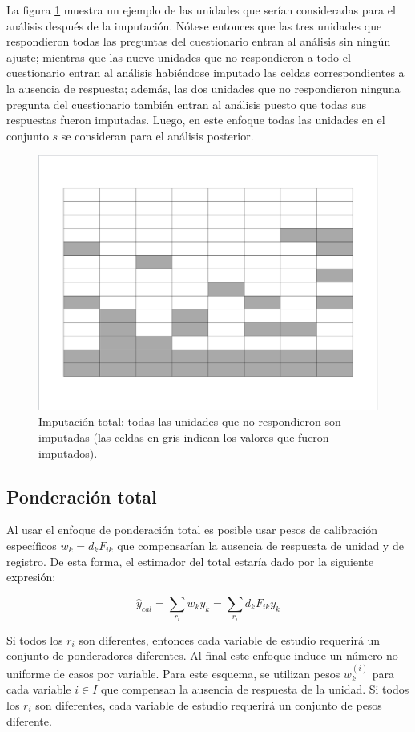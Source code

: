 \documentclass[
  12pt,
]{book}
\begin{document}
La figura \ref{fig:figimptotal} muestra un ejemplo de las unidades que serían consideradas para el análisis después de la imputación. Nótese entonces que las tres unidades que respondieron todas las preguntas del cuestionario entran al análisis sin ningún ajuste; mientras que las nueve unidades que no respondieron a todo el cuestionario entran al análisis habiéndose imputado las celdas correspondientes a la ausencia de respuesta; además, las dos unidades que no respondieron ninguna pregunta del cuestionario también entran al análisis puesto que todas sus respuestas fueron imputadas. Luego, en este enfoque todas las unidades en el conjunto \(s\) se consideran para el análisis posterior.

\begin{figure}
\includegraphics[width=0.5\linewidth]{Pics/j3} \caption{Imputación total: todas las unidades que no respondieron son imputadas (las celdas en gris indican los valores que fueron imputados).}\label{fig:figimptotal}
\end{figure}

\hypertarget{ponderaciuxf3n-total}{%
\subsection{Ponderación total}\label{ponderaciuxf3n-total}}

Al usar el enfoque de ponderación total es posible usar pesos de calibración específicos \(w_k = d_k F_{ik}\) que compensarían la ausencia de respuesta de unidad y de registro. De esta forma, el estimador del total estaría dado por la siguiente expresión:

\[
\hat{y}_{cal}=\sum_{r_i}w_ky_k = 
\sum_{r_i}d_k F_{ik} y_k
\]

Si todos los \(r_i\) son diferentes, entonces cada variable de estudio requerirá un conjunto de ponderadores diferentes. Al final este enfoque induce un número no uniforme de casos por variable. Para este esquema, se utilizan pesos \(w_k^{(i)}\) para cada variable \(i \in I\) que compensan la ausencia de respuesta de la unidad. Si todos los \(r_i\) son diferentes, cada variable de estudio requerirá un conjunto de pesos diferente.
\end{document}

